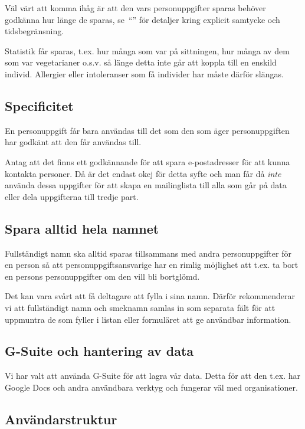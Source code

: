 Väl värt att komma ihåg är att den vars personuppgifter sparas behöver godkänna hur länge de sparas, se~``'' för detaljer kring explicit samtycke och tidsbegränsning.

Statistik får sparas, t.ex. hur många som var på sittningen, hur många av dem som var vegetarianer o.s.v. så länge detta inte går att koppla till en enskild individ. Allergier eller intoleranser som få individer har måste därför slängas.

\subsection{Specificitet}

En personuppgift får bara användas till det som den som äger personuppgiften har godkänt att den får användas till.

Antag att det finns ett godkännande för att spara e-postadresser för att kunna kontakta personer. Då är det endast okej för detta syfte och man får då \textit{inte} använda dessa uppgifter för att skapa en mailinglista till alla som går på data eller dela uppgifterna till tredje part.

\subsection{Spara alltid hela namnet}

Fullständigt namn ska alltid sparas tillsammans med andra personuppgifter för en person så att personuppgiftsansvarige har en rimlig möjlighet att t.ex. ta bort en persons personuppgifter om den vill bli bortglömd.

Det kan vara svårt att få deltagare att fylla i sina namn. Därför rekommenderar vi att fullständigt namn och smeknamn samlas in som separata fält för att uppmuntra de som fyller i listan eller formuläret att ge användbar information.

\subsection{G-Suite och hantering av data}

Vi har valt att använda G-Suite för att lagra vår data. Detta för att den t.ex. har Google Docs och andra användbara verktyg och fungerar väl med organisationer.

\subsection{Användarstruktur}

